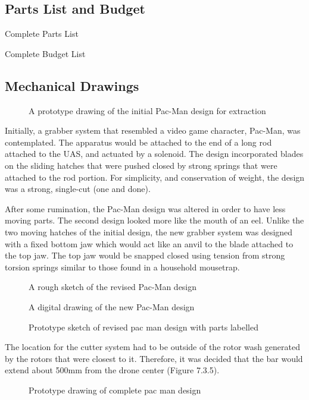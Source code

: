 \documentclass{wrcecapstone}
\begin{document}
\subsection{Parts List and Budget}
\begin{table}
\caption{Complete Parts List}
\end{table}

\begin{table}
\caption{Complete Budget List}
\end{table}

\subsection{Mechanical Drawings}

\begin{figure}
\caption{A prototype drawing of the initial Pac-Man design for extraction}
\end{figure}
Initially, a grabber system that resembled a video game character, Pac-Man, was contemplated.  The apparatus would be attached to the end of a long rod attached to the UAS, and actuated by a solenoid.  The design incorporated blades on the sliding hatches that were pushed closed by strong springs that were attached to the rod portion.  For simplicity, and conservation of weight, the design was a strong, single-cut (one and done). 

After some rumination, the Pac-Man design was altered in order to have less moving parts.  The second design looked more like the mouth of an eel.  Unlike the two moving hatches of the initial design, the new grabber system was designed with a fixed bottom jaw which would act like an anvil to the blade attached to the top jaw.  The top jaw would be snapped closed using tension from strong torsion springs similar to those found in a household mousetrap.
\begin{figure}
\caption{A rough sketch of the revised Pac-Man design}
\end{figure}

\begin{figure}
\caption{A digital drawing of the new Pac-Man design}
\end{figure}

\begin{figure}
\caption{Prototype sketch of revised pac man design with parts labelled}
\end{figure}

The location for the cutter system had to be outside of the rotor wash generated by the rotors that were closest to it.  Therefore, it was decided that the bar would extend about 500mm from the drone center (Figure 7.3.5). 
\begin{figure}
\caption{Prototype drawing of complete pac man design}
\end{figure}
 
\end{document}
